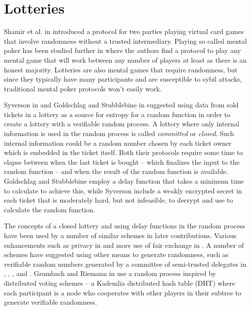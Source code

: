 \section{Lotteries}
\label{sec:lotteries}

Shamir et al. in \cite{shamir_mental_1981} introduced a protocol for two parties playing virtual card games that involve randomness without a trusted intermediary. Playing so called mental poker has been studied further in \cite{goldreich_how_1987} where the authors find a protocol to play any mental game that will work between any number of players at least as there is an honest majority. Lotteries are also mental games that require randomness, but since they typically have many participants and are susceptible to sybil attacks, traditional mental poker protocols won't easily work.

Syverson in \cite{syverson_weakly_1998} and Goldschlag and Stubblebine in \cite{goldschlag_publicly_1998} suggested using data from sold tickets in a lottery as a source for entropy for a random function in order to create a lottery with a verifiable random process. A lottery where only internal information is used in the random process is called \emph{committed} or \emph{closed}. Such internal information could be a random number chosen by each ticket owner which is embedded in the ticket itself. Both their protocols require some time to elapse between when the last ticket is bought – which finalizes the input to the random function – and when the result of the random function is available. Goldschlag and Stubblebine employ a delay function that takes a minimum time to calculate to achieve this, while Syverson include a weakly encrypted secret in each ticket that is moderately hard, but not infeasible, to decrypt and use to calculate the random function.

The concepts of a closed lottery and using delay functions in the random process have been used by a number of similar schemes in later contributions. Various enhancements such as privacy in \cite{zhou_playing_2001} and more use of fair exchange in \cite{chow_e-lottery_2005}. A number of schemes have suggested using other means to generate randomness, such as verifiable random numbers generated by a committee of semi-trusted delegates in \cite{fouque_sharing_2001}, \cite{lee_design_2009}, \cite{liu_improved_2014}, and \cite{xia_information_2019}. Grumbach and Riemann in \cite{grumbach_distributed_2017} use a random process inspired by distributed voting schemes – a Kademlia distributed hash table (DHT) where each participant is a node who cooperates with other players in their subtree to generate verifiable randomness. 


